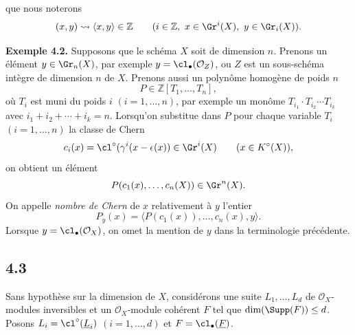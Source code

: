 que nous noterons
\[
 (x,y)\rightsquigarrow \langle x,y\rangle\in\mathbb Z
 \qquad (i\in\mathbb Z,\ x\in\Gr^i(X),\ y\in\Gr_i(X)).
\]

\textbf{Exemple 4.2.} Supposons que le schéma \(X\) soit de dimension \(n\). Prenons un élément \(y\in\Gr_n(X)\), par exemple \(y=\cl_\bullet(\mathcal O_Z)\), ou \(Z\) est un sous-schéma intègre de dimension \(n\) de \(X\). Prenons aussi un polynôme homogène de poids \(n\)
\[
 P\in\mathbb Z[T_1,\ldots,T_n],
\]
où \(T_i\) est muni du poids \(i\) \((i=1,\ldots,n)\), par exemple un monôme \(T_{i_1}\cdot T_{i_2}\cdots T_{i_k}\) avec \(i_1+i_2+\cdots+i_k=n\). Lorsqu'on substitue dans \(P\) pour chaque variable \(T_i\) \((i=1,\ldots,n)\) la classe de Chern
\[
 c_i(x)=\cl^\circ(\gamma^i(x-\epsilon(x))\in\Gr^i(X)
 \qquad(x\in K^\circ(X)),
\]
on obtient un élément
\[
 P(c_1(x),\ldots,c_n(X))\in\Gr^n(X).
\]
On appelle \emph{nombre de Chern} de \(x\) relativement à \(y\) l'entier
\[
 P_y(x)=\bigl\langle P(c_1(x)),\ldots,c_n(x),y\bigr\rangle.
\]
Lorsque \(y=\cl_\bullet(\mathcal O_X)\), on omet la mention de \(y\) dans la terminologie précédente.

\subsection*{4.3}
Sans hypothèse sur la dimension de \(X\), considérons une suite \(L_1,\ldots,L_d\) de \(\mathcal O_X\)-modules inversibles et un \(\mathcal O_X\)-module cohérent \(F\) tel que \(\dim(\Supp(F))\leq d\). Posons \(L_i=\cl^\circ(\underline L_i)\) \((i=1,\ldots,d)\) et \(F=\cl_\bullet(\underline F)\).

